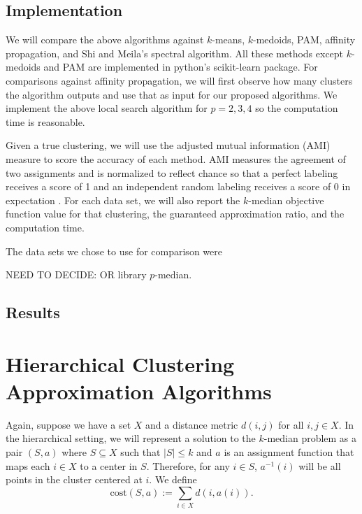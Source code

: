 \documentclass{article}
\begin{document}
\subsection{Implementation}

We will compare the above algorithms against $k$-means, $k$-medoids, PAM, affinity propagation, and Shi and Meila's spectral algorithm. All these methods except $k$-medoids and PAM are implemented in python's scikit-learn package. For comparisons against affinity propagation, we will first observe how many clusters the algorithm outputs and use that as input for our proposed algorithms. We implement the above local search algorithm for $p=2, 3,4$ so the computation time is reasonable. 

Given a true clustering, we will use the adjusted mutual information (AMI) measure to score the accuracy of each method. AMI measures the agreement of two assignments and is normalized to reflect chance so that a perfect labeling receives a score of 1 and an independent random labeling receives a score of 0 in expectation \cite{Vinh}. For each data set, we will also report the $k$-median objective function value for that clustering, the guaranteed approximation ratio, and the computation time. 

The data sets we chose to use for comparison were 

NEED TO DECIDE:
OR library $p$-median.

\subsection{Results}

\section{Hierarchical Clustering Approximation Algorithms}
Again, suppose we have a set $X$ and a distance metric $d(i,j)$ for all $i,j \in X$. In the hierarchical setting, we will represent a solution to the $k$-median problem as a pair $(S, a)$ where $S \subseteq X$ such that $|S| \leq k$ and $a$ is an assignment function that maps each $i \in X$ to a center in $S$. Therefore, for any $i \in S$, $a^{-1}(i)$ will be all points in the cluster centered at $i$. We define
\[ \mathrm{cost}(S,a) := \sum_{i \in X} d(i, a(i)) . \]
\end{document}
